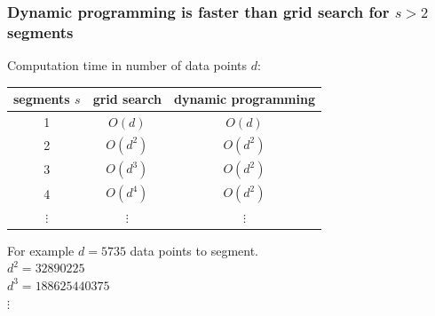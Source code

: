 \documentclass{beamer}
\begin{document}






\begin{frame}
  \frametitle{Dynamic programming is faster than grid search for $s>
    2$ segments}

  Computation time in number of data points $d$:

  \vskip 1cm

  \begin{tabular}{ccc}
    segments $s$ & grid search & dynamic programming \\
    \hline
    1 & $O(d)$ & $O(d)$ \\
    2 & $O(d^2)$ & $O(d^2)$ \\
    3 & $O(d^3)$ & $O(d^2)$ \\
    4 & $O(d^4)$ & $O(d^2)$ \\
    $\vdots$ &     $\vdots$ &     $\vdots$ 
  \end{tabular}

  \vskip 1cm

  For example $d = 5735$ data points to segment.\\
  $d^2 = 32890225$\\
  $d^3 = 188625440375$\\
  $\vdots$
\end{frame}


\end{document}
